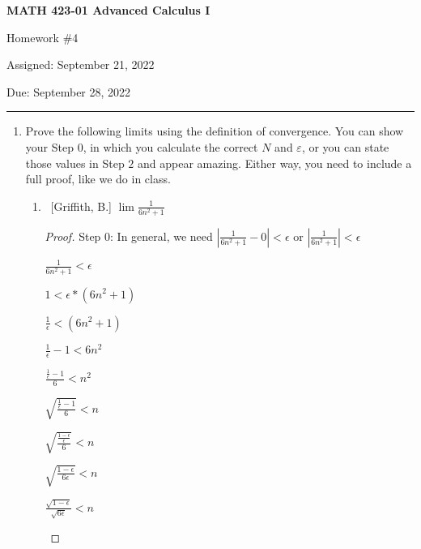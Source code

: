\documentclass[10pt]{article}
\begin{document}
\pagestyle{empty}  %

\begin{center}  %

{\bf MATH 423-01  Advanced Calculus I

Homework \#4

Assigned: September 21, 2022

Due: September 28, 2022}

\end{center}

\medskip

\hrule   %

\bigskip


\begin{enumerate}


\item  Prove the following limits using the definition of convergence.  You can show your Step $0$, in which you calculate the correct $N$ and $\varepsilon$, or you can state those values in Step $2$ and appear amazing.  Either way, you need to include a full proof, like we do in class.

	\begin{enumerate}
	
	\item  ~[Griffith, B.] $\lim \frac{1}{6n^2+1}$
 \begin{proof}
     
     Step 0: In general, we need $|\frac{1}{6n^2+1}-0|<\epsilon$ or $|\frac{1}{6n^2+1}| < \epsilon$
     
     
     \begin{center}
     $\frac{1}{6n^2+1} < \epsilon$

     $1 < \epsilon * (6n^2+1)$
     
     $\frac{1}{\epsilon} < (6n^2+1)$
     
     $\frac{1}{\epsilon}-1 < 6n^2$
     
     $\frac{\frac{1}{\epsilon}-1}{6} < n^2$

     $\sqrt{\frac{\frac{1}{\epsilon}-1}{6}}< n$

     $\sqrt{\frac{\frac{1-\epsilon}{\epsilon}}{6}} < n$

     $\sqrt{\frac{1-\epsilon}{6\epsilon}} < n$

     $\frac{\sqrt{1-\epsilon}}{\sqrt{6\epsilon}} < n$
     

\end{center}
\end{proof}
\end{enumerate}
\end{enumerate}
\end{document}
